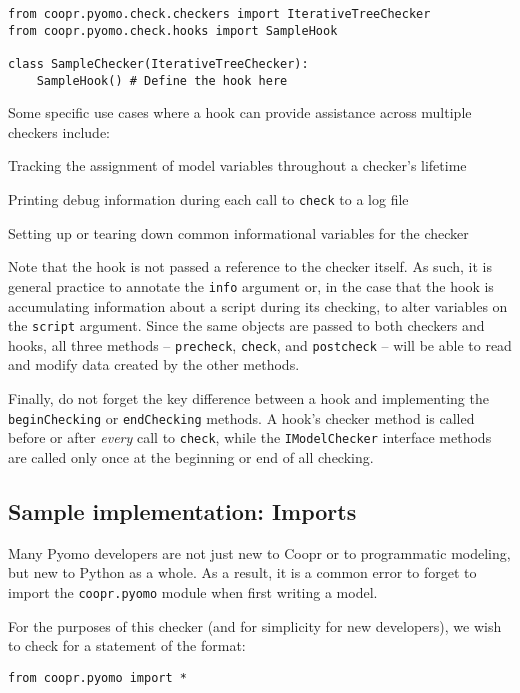 \documentclass{article}
\begin{document}
\begin{verbatim}
from coopr.pyomo.check.checkers import IterativeTreeChecker
from coopr.pyomo.check.hooks import SampleHook

class SampleChecker(IterativeTreeChecker):
    SampleHook() # Define the hook here
\end{verbatim}

Some specific use cases where a hook can provide assistance across multiple checkers include:

\begin{itemize*}
\item Tracking the assignment of model variables throughout a checker's lifetime
\item Printing debug information during each call to \verb!check! to a log file
\item Setting up or tearing down common informational variables for the checker
\end{itemize*}

Note that the hook is not passed a reference to the checker itself. As such, it is general practice to annotate the \verb!info! argument or, in the case that the hook is accumulating information about a script during its checking, to alter variables on the \verb!script! argument. Since the same objects are passed to both checkers and hooks, all three methods -- \verb!precheck!, \verb!check!, and \verb!postcheck! -- will be able to read and modify data created by the other methods.

Finally, do not forget the key difference between a hook and implementing the \verb!beginChecking! or \verb!endChecking! methods. A hook's checker method is called before or after \textit{every} call to \verb!check!, while the \verb!IModelChecker! interface methods are called only once at the beginning or end of all checking.

\subsection*{Sample implementation: Imports}
Many Pyomo developers are not just new to Coopr or to programmatic modeling, but new to Python as a whole. As a result, it is a common error to forget to import the \verb!coopr.pyomo! module when first writing a model.

For the purposes of this checker (and for simplicity for new developers), we wish to check for a statement of the format:

\begin{verbatim}
from coopr.pyomo import *
\end{verbatim}
\end{document}

